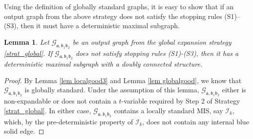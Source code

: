 \documentclass{article}
\newcommand{\1}{\mathds{1}}
\numberwithin{equation}{section}
\newcommand{\fa}{{\mathfrak a}}
\newcommand{\fb}{{\mathfrak b}}
\renewcommand{\cal}{\mathcal}
\theoremstyle{plain} %
\newtheorem{lemma}[theorem]{Lemma}
\theoremstyle{remark}
\newcommand{\Iso}{{\mathcal I}}
\begin{document}
Using the definition of globally standard graphs, it is easy to show that if an output graph from the above strategy does not satisfy the stopping rules (S1)--(S3), then it must have a deterministic maximal subgraph. 
\begin{lemma}\label{lemm expansionstrat_nonstop}
Let $\cal G_{\fa,\fb_1\fb_2}$ be an output graph from the global expansion strategy \ref{strat_global}. If $\cal G_{\fa,\fb_1\fb_2}$ does not satisfy stopping rules (S1)-(S3), then it has a deterministic maximal subgraph with a doubly connected structure. %
\end{lemma}
\begin{proof}
By Lemma \ref{lem localgood3} and Lemma \ref{lem globalgood}, we know that $\cal G_{\fa,\fb_1\fb_2}$ is globally standard. Under the assumption of this lemma, $\cal G_{\fa,\fb_1\fb_2}$ either is non-expandable or does not contain a $t$-variable required by Step 2 of Strategy \ref{strat_global}. In either case, $\cal G_{\fa,\fb_1\fb_2}$ contains a locally standard MIS, say $\Iso_k$, which, by the pre-deterministic property of $\Iso_k$, does not contain any internal blue solid edge. 


\end{proof}
\end{document}
